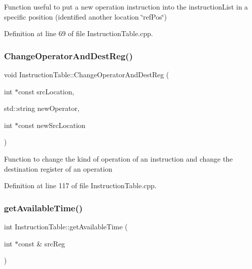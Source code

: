 Function useful to put a new operation instruction into the instruction\+List in a specific position (identified another location \char`\"{}ref\+Pos\char`\"{}) 



Definition at line 69 of file Instruction\+Table.\+cpp.

\mbox{\label{classoctantis_1_1InstructionTable_a938ebc5835b19c35178c27e635085c18}} 
\subsubsection{\texorpdfstring{Change\+Operator\+And\+Dest\+Reg()}{ChangeOperatorAndDestReg()}}
{\footnotesize\ttfamily void Instruction\+Table\+::\+Change\+Operator\+And\+Dest\+Reg (\begin{DoxyParamCaption}\item[{int $\ast$const}]{src\+Location,  }\item[{std\+::string}]{new\+Operator,  }\item[{int $\ast$const}]{new\+Src\+Location }\end{DoxyParamCaption})}

Function to change the kind of operation of an instruction and change the destination register of an operation 

Definition at line 117 of file Instruction\+Table.\+cpp.

\mbox{\label{classoctantis_1_1InstructionTable_a1c2294b6a66fb8811b09380678f8881c}} 
\subsubsection{\texorpdfstring{get\+Available\+Time()}{getAvailableTime()}}
{\footnotesize\ttfamily int Instruction\+Table\+::get\+Available\+Time (\begin{DoxyParamCaption}\item[{int $\ast$const \&}]{src\+Reg }\end{DoxyParamCaption})}



